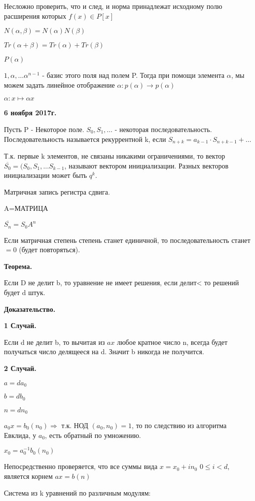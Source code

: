 \documentclass{article}
\begin{document}
Несложно проверить, что и след, и норма принадлежат исходному полю расширения которых $f(x)\in P[x]$

$N(\alpha, \beta)=N(\alpha)N(\beta)$

$Tr(\alpha+\beta)=Tr(\alpha)+Tr(\beta)$

$P(\alpha)$

$1, \alpha, \ldots \alpha^{n-1}$ - базис этого поля над полем P. Тогда при помощи элемента $\alpha$, мы можем задать линейное отображение $\alpha:p(\alpha)\to p(\alpha)$

$\alpha: x \mapsto \alpha x$

\textbf {6 ноября 2017г.}

 Пусть P - Некоторое поле. $S_0, S_1, \ldots$ - некоторая последовательность. Последовательность называется рекуррентной k, если $S_{n+k}=a_{k-1}\cdot S_{n+k-1} + \ldots$
 
 Т.к. первые k элементов, не связаны никакими ограничениями, то вектор $\overline {S_0}=(S_0, S_1, \ldots S_{k-1}$, называют вектором инициализации. Разных векторов инициализации может быть $q^k$. 
 
Матричная запись регистра сдвига.

A=МАТРИЦА

$\overline{S_n}=S_0A^n$

Если матричная степень степень станет единичной, то последовательность станет $=0$ (будет повторяться).

{\bf Теорема.}

Если D не делит b, то уравнение не имеет решения, если делит< то решений будет d штук.

{\bf Доказательство.}

{\bf 1 Случай.}

Если d не делит b, то вычитая из $ax$ любое кратное число n, всегда будет получаться число делящееся на d. Значит b никогда не получится.

{\bf 2 Случай.}

$a=da_0$

$b=db_0$

$n=dn_0$

$a_0x=b_0(n_0)\Rightarrow$ т.к. НОД $(a_0, n_0)=1$, то по следствию из алгоритма Евклида, у $a_0$, есть обратный по умножению.

$x_0=a^{-1}_0b_0(n_0)$

Непосредственно проверяется, что все суммы вида $x=x_0+in_0$ $0\leq i < d$, является корнем $ax=b(n)$

Система из k уравнений по различным модулям:
\end{document}
